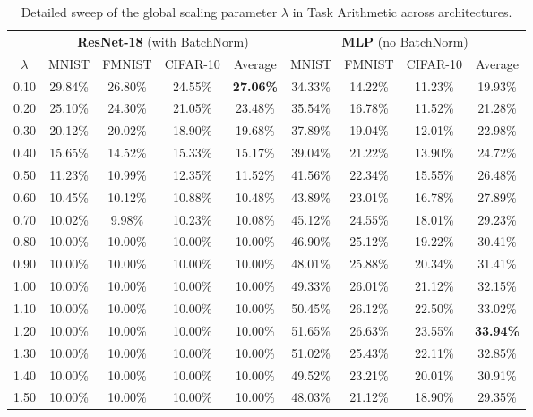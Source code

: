 \documentclass{article}
\begin{document}
\begin{table}[h]
\caption{Detailed sweep of the global scaling parameter $\lambda$ in Task Arithmetic across architectures.}
\label{tab:ta_sweep}
\begin{center}
\begin{tabular}{ccccc|cccc}
\toprule
 & \multicolumn{4}{c}{\textbf{ResNet-18} (with BatchNorm)} & \multicolumn{4}{c}{\textbf{MLP} (no BatchNorm)} \\
$\lambda$ & MNIST & FMNIST & CIFAR-10 & Average & MNIST & FMNIST & CIFAR-10 & Average \\
\midrule
0.10 & 29.84\% & 26.80\% & 24.55\% & \textbf{27.06\%} & 34.33\% & 14.22\% & 11.23\% & 19.93\% \\
0.20 & 25.10\% & 24.30\% & 21.05\% & 23.48\% & 35.54\% & 16.78\% & 11.52\% & 21.28\% \\
0.30 & 20.12\% & 20.02\% & 18.90\% & 19.68\% & 37.89\% & 19.04\% & 12.01\% & 22.98\% \\
0.40 & 15.65\% & 14.52\% & 15.33\% & 15.17\% & 39.04\% & 21.22\% & 13.90\% & 24.72\% \\
0.50 & 11.23\% & 10.99\% & 12.35\% & 11.52\% & 41.56\% & 22.34\% & 15.55\% & 26.48\% \\
0.60 & 10.45\% & 10.12\% & 10.88\% & 10.48\% & 43.89\% & 23.01\% & 16.78\% & 27.89\% \\
0.70 & 10.02\% & 9.98\%  & 10.23\% & 10.08\% & 45.12\% & 24.55\% & 18.01\% & 29.23\% \\
0.80 & 10.00\% & 10.00\% & 10.00\% & 10.00\% & 46.90\% & 25.12\% & 19.22\% & 30.41\% \\
0.90 & 10.00\% & 10.00\% & 10.00\% & 10.00\% & 48.01\% & 25.88\% & 20.34\% & 31.41\% \\
1.00 & 10.00\% & 10.00\% & 10.00\% & 10.00\% & 49.33\% & 26.01\% & 21.12\% & 32.15\% \\
1.10 & 10.00\% & 10.00\% & 10.00\% & 10.00\% & 50.45\% & 26.12\% & 22.50\% & 33.02\% \\
1.20 & 10.00\% & 10.00\% & 10.00\% & 10.00\% & 51.65\% & 26.63\% & 23.55\% & \textbf{33.94\%} \\
1.30 & 10.00\% & 10.00\% & 10.00\% & 10.00\% & 51.02\% & 25.43\% & 22.11\% & 32.85\% \\
1.40 & 10.00\% & 10.00\% & 10.00\% & 10.00\% & 49.52\% & 23.21\% & 20.01\% & 30.91\% \\
1.50 & 10.00\% & 10.00\% & 10.00\% & 10.00\% & 48.03\% & 21.12\% & 18.90\% & 29.35\% \\
\bottomrule
\end{tabular}
\end{center}
\end{table}
\end{document}
